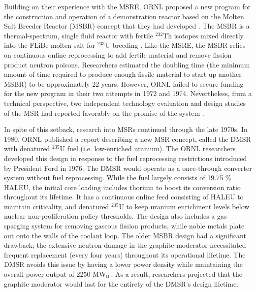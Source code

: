 Building on their experience with the \gls{MSRE}, \gls{ORNL} proposed a
new program for the construction and operation of a demonstration reactor
based on the Molten Salt Breeder Reactor (MSBR) concept that they had
developed \cite{macpherson_molten_1985}. The \gls{MSBR} is a thermal-spectrum,
single fluid reactor with fertile $^{232}$Th isotopes mixed directly into the
FLiBe molten salt for $^{233}$U breeding \cite{gehin_liquid_2016}. Like the
\gls{MSRE}, the \gls{MSBR} relies on continuous online reprocessing to add
fertile material and remove fission product neutron poisons. Researchers
estimated the doubling time (the minimum amount of time required to produce
enough fissile material to start up another \gls{MSBR}) to be
approximately 22 years. However, \gls{ORNL} failed to secure funding for the
new program in their two attempts in 1972 and 1974. Nevertheless, from a
technical perspective, two independent
technology evaluation and design studies of the \gls{MSR} had reported
favorably on the promise of the system \cite{macpherson_molten_1985}.

In spite of this setback, research into \glspl{MSR} continued through the late
1970s. In 1980, \gls{ORNL} published a report describing a new \gls{MSR}
concept, called the \gls{DMSR} \cite{gehin_liquid_2016} with denatured
$^{235}$U fuel (i.e. low-enriched uranium). The \gls{ORNL} researchers
developed this design in response to the fuel reprocessing restrictions
introduced by President Ford in 1976. The \gls{DMSR} would operate as a
once-through
converter system without fuel reprocessing. While the fuel largely consists of
19.75 \% \gls{HALEU}, the initial core loading includes thorium to
boost its conversion ratio throughout its lifetime. It has a continuous
online feed consisting of \gls{HALEU} to maintain criticality, and denatured
$^{235}$U to keep uranium enrichment levels below nuclear non-proliferation
policy thresholds. The design also includes a gas sparging system for removing
gaseous fission products, while noble metals plate out onto the walls of
the coolant loop. The older \gls{MSBR} design had a significant drawback; the
extensive neutron damage in the graphite moderator necessitated frequent
replacement (every four years) throughout its operational lifetime. The
\gls{DMSR} avoids this issue by having a lower power density while maintaining
the overall power output of 2250 MW$_{\text{th}}$. As a result, researchers
projected that the graphite moderator would last for the entirety of the
\gls{DMSR}'s design lifetime.

